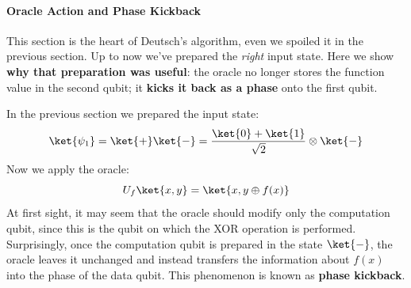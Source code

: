 \paragraph{Oracle Action and Phase Kickback}\label{ex:oracle-action-and-phase-kickback}

This section is the heart of Deutsch's algorithm, even we spoiled it in the previous section. Up to now we've prepared the \emph{right} input state. Here we show \textbf{why that preparation was useful}: the oracle no longer stores the function value in the second qubit; it \textbf{kicks it back as a phase} onto the first qubit.

\highspace
In the previous section we prepared the input state:
\begin{equation*}
    \ket{\psi_1} = \ket{+} \ket{-} = \frac{\ket{0} + \ket{1}}{\sqrt{2}} \otimes \ket{-}
\end{equation*}
Now we apply the oracle:
\begin{equation*}
    U_f \ket{x, y} = \ket{x, y \oplus f(x)}
\end{equation*}
At first sight, it may seem that the oracle should modify only the computation qubit, since this is the qubit on which the XOR operation is performed. Surprisingly, once the computation qubit is prepared in the state $\ket{-}$, the oracle leaves it unchanged and instead transfers the information about $f(x)$ into the phase of the data qubit. This phenomenon is known as \textbf{phase kickback}.

